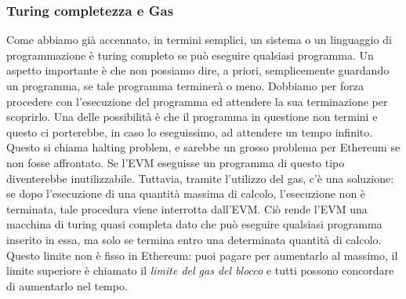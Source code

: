 \subsubsection{Turing completezza e Gas}
Come abbiamo già accennato, in termini semplici, un sistema o un linguaggio di programmazione è turing completo se può eseguire qualsiasi programma. Un aspetto importante è che non possiamo dire, a priori, semplicemente guardando un programma, se tale programma terminerà o meno. Dobbiamo per forza procedere con l'esecuzione del programma ed attendere la sua terminazione per scoprirlo. Una delle possibilità è che il programma in questione non termini e questo ci porterebbe, in caso lo eseguissimo, ad attendere un tempo infinito. Questo si chiama halting problem, e sarebbe un grosso problema per Ethereum se non fosse affrontato. Se l'EVM eseguisse un programma di questo tipo diventerebbe inutilizzabile. Tuttavia, tramite l'utilizzo del gas, c'è una soluzione: se dopo l'esecuzione di una quantità massima di calcolo, l'esecuzione non è terminata, tale procedura viene interrotta dall'EVM. Ciò rende l'EVM una macchina di turing quasi completa dato che può eseguire qualsiasi programma inserito in essa, ma solo se termina entro una determinata quantità di calcolo. Questo limite non è fisso in Ethereum: puoi pagare per aumentarlo al massimo, il limite superiore è chiamato il \textit{limite del gas del blocco} e tutti possono concordare di aumentarlo nel tempo. 

